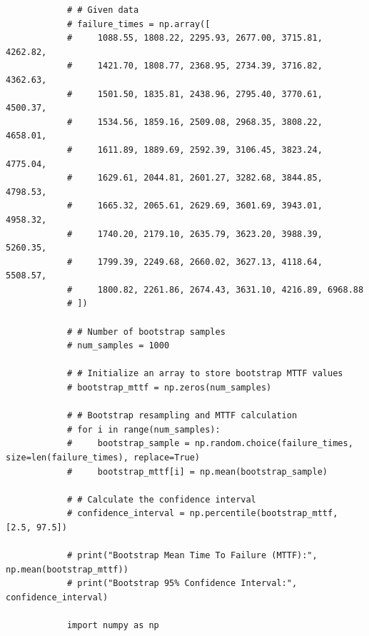 \documentclass{article}
\begin{document}
\begin{enumerate}[label=(\alph*)]
\begin{enumerate}[label=(\alph*)]
\begin{flushleft}
\begin{lstlisting}
            # # Given data
            # failure_times = np.array([
            #     1088.55, 1808.22, 2295.93, 2677.00, 3715.81, 4262.82,
            #     1421.70, 1808.77, 2368.95, 2734.39, 3716.82, 4362.63,
            #     1501.50, 1835.81, 2438.96, 2795.40, 3770.61, 4500.37,
            #     1534.56, 1859.16, 2509.08, 2968.35, 3808.22, 4658.01,
            #     1611.89, 1889.69, 2592.39, 3106.45, 3823.24, 4775.04,
            #     1629.61, 2044.81, 2601.27, 3282.68, 3844.85, 4798.53,
            #     1665.32, 2065.61, 2629.69, 3601.69, 3943.01, 4958.32,
            #     1740.20, 2179.10, 2635.79, 3623.20, 3988.39, 5260.35,
            #     1799.39, 2249.68, 2660.02, 3627.13, 4118.64, 5508.57,
            #     1800.82, 2261.86, 2674.43, 3631.10, 4216.89, 6968.88
            # ])
            
            # # Number of bootstrap samples
            # num_samples = 1000
            
            # # Initialize an array to store bootstrap MTTF values
            # bootstrap_mttf = np.zeros(num_samples)
            
            # # Bootstrap resampling and MTTF calculation
            # for i in range(num_samples):
            #     bootstrap_sample = np.random.choice(failure_times, size=len(failure_times), replace=True)
            #     bootstrap_mttf[i] = np.mean(bootstrap_sample)
            
            # # Calculate the confidence interval
            # confidence_interval = np.percentile(bootstrap_mttf, [2.5, 97.5])
            
            # print("Bootstrap Mean Time To Failure (MTTF):", np.mean(bootstrap_mttf))
            # print("Bootstrap 95% Confidence Interval:", confidence_interval)
            
            import numpy as np
            

\end{lstlisting}
\end{flushleft}
\end{enumerate}
\end{enumerate}
\end{document}
